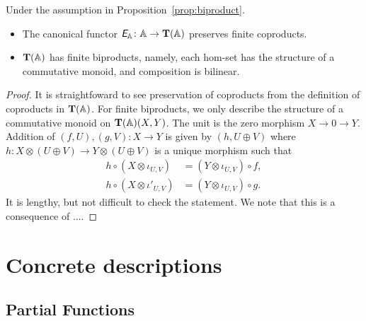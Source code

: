 \begin{corollary}\label{cor:biproduct}
  Under the assumption in Proposition~\ref{prop:biproduct}.
  \begin{itemize}
  \item The canonical functor $\textit{\textsf{E}}_{\mathbb{A}} \colon \mathbb{A} \to \mathbf T(\mathbb{A})$ preserves
    finite coproducts.
  \item $\mathbf T(\mathbb{A})$ has finite biproducts, namely, each hom-set has the structure
    of a commutative monoid, and composition is bilinear.
  \end{itemize}
\end{corollary}
\begin{proof}
  It is straightfoward to see preservation of coproducts from the definition
  of coproducts in $\mathbf T(\mathbb{A})$. For finite biproducts, we only describe the
  structure of a commutative monoid on $\mathbf T(\mathbb{A})(X,Y)$. The unit is the zero
  morphism $X \longrightarrow 0 \longrightarrow Y$. Addition of $(f,U),(g,V)
  \colon X \to Y$ is given by $(h,U \oplus V)$ where $h \colon X \otimes (U
  \oplus V) \to Y \otimes (U \oplus V)$ is a unique morphism such that
  \begin{align*}
    h \circ (X \otimes \iota_{U,V}) &= (Y \otimes \iota_{U,V}) \circ f, \\
    h \circ (X \otimes \iota'_{U,V}) &= (Y \otimes \iota_{U,V}) \circ g.
  \end{align*}
  It is lengthy, but not difficult to check the statement.
  We note that this is a consequence of ....
\end{proof}

\section{Concrete descriptions}

\subsection{Partial Functions}


